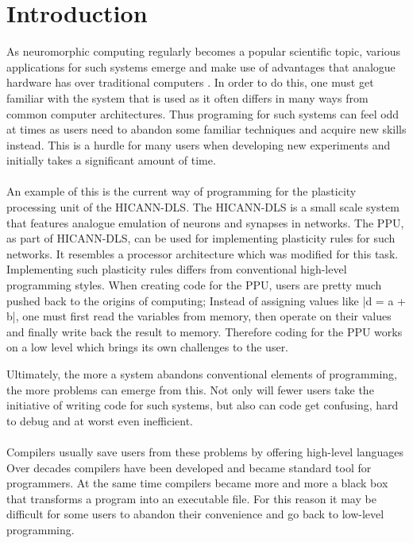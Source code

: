 \chapter{Introduction}
\label{chapter:introduction}

As neuromorphic computing regularly becomes a popular scientific topic, various  applications for such systems emerge and make use of advantages that analogue hardware has over traditional computers .
In order to do this, one must get familiar with the system that is used as it often differs in many ways from common computer architectures.
Thus programing for such systems can feel odd at times as users need to abandon some familiar techniques and acquire new skills instead.
This is a hurdle for many users when developing new experiments and initially takes a significant amount of time. 
\\
\\
An example of this is the current way of programming for the plasticity processing unit of the \ac{HICANN-DLS}. 
The \ac{HICANN-DLS} is a small scale system that features analogue emulation of neurons and synapses in networks.
The \ac{PPU}, as part of \ac{HICANN-DLS}, can be used for implementing plasticity rules for such networks.
It resembles a processor architecture which was modified for this task.
Implementing such plasticity rules differs from conventional high-level programming styles. 
When creating code for the \ac{PPU}, users are pretty much pushed back to the origins of computing;
Instead of assigning values like |d = a + b|, one must first read the variables from memory, then operate on their values and finally write back the result to memory.
Therefore coding for the \ac{PPU} works on a low level which brings its own challenges to the user.

Ultimately, the more a system abandons conventional elements of programming, the more problems can emerge from this.
Not only will fewer users take the initiative of writing code for such systems, but also can code get confusing, hard to debug and at worst even inefficient.
\\
\\
Compilers usually save users from these problems by offering high-level languages
Over decades compilers have been developed and became standard tool for programmers.
At the same time compilers became more and more a black box that transforms a program into an executable file.
For this reason it may be difficult for some users to abandon their convenience and go back to low-level programming.

